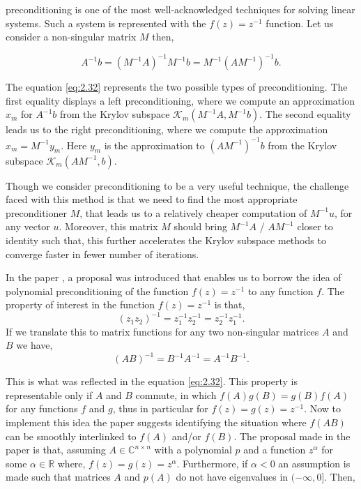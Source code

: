 preconditioning is one of the most well-acknowledged techniques for solving linear systems. Such a system is represented with the $f(z) = z^{-1}$ function. Let us consider a non-singular matrix $M$ then,

\begin{equation}
    A^{-1}b = (M^{-1}A)^{-1}M^{-1}b = M^{-1}(AM^{-1})^{-1}b.
    \label{eq:2.32}
\end{equation}

The equation \eqref{eq:2.32} represents the two possible types of preconditioning. The first equality displays a left preconditioning, where we compute an approximation $x_{m}$ for $A^{-1}b$ from the Krylov subspace $\mathcal{K}_{m}(M^{-1}A, M^{-1}b)$. The second equality leads us to the right preconditioning, where we compute the approximation $x_{m} = M^{-1}y_{m}$. Here $y_{m}$ is the approximation to $(AM^{-1})^{-1}b$ from the Krylov subspace $\mathcal{K}_{m}(AM^{-1}, b)$.

Though we consider preconditioning to be a very useful technique, the challenge faced with this method is that we need to find the most appropriate preconditioner $M$, that leads us to a relatively cheaper computation of $M^{-1}u$, for any vector $u$. Moreover, this matrix $M$ should bring $M^{-1}A$ / $AM^{-1}$ closer to identity such that, this further accelerates the Krylov subspace methods to converge faster in fewer number of iterations.

In the paper \cite{49}, a proposal was introduced that enables us to borrow the idea of polynomial preconditioning of the function $f(z)=z^{-1}$ to any function $f$. The property of interest in the function $f(z) = z^{-1}$ is that,
\[
    (z_{1}z_{2})^{-1} = z_{1}^{-1}z_{2}^{-1} = z_{2}^{-1}z_{1}^{-1}.
\]
If we translate this to matrix functions for any two non-singular matrices $A$ and $B$ we have,
\[
    (AB)^{-1} =B^{-1}A^{-1} = A^{-1}B^{-1}.
\]

This is what was reflected in the equation \eqref{eq:2.32}. This property is representable only if $A$ and $B$ commute, in which $f(A)g(B) = g(B)f(A)$ for any functions $f$ and $g$, thus in particular for $f(z) = g(z) = z^{-1}$. Now to implement this idea the paper \cite{49} suggests identifying the situation where $f(AB)$ can be smoothly interlinked to $f(A)$ and/or $f(B)$. The proposal made in the paper is that, assuming $A \in \mathbb{C}^{n \times n}$ with a polynomial $p$ and a function $z^{\alpha}$ for some $\alpha \in \mathbb{R}$ where, $f(z) = g(z) = z^{\alpha}$. Furthermore, if $\alpha < 0$ an assumption is made such that matrices $A$ and $p(A)$ do not have eigenvalues in $(-\infty, 0]$. Then,

